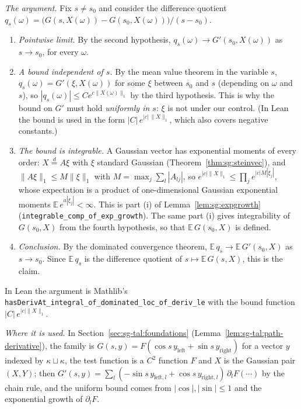 \begin{remark}
\emph{The argument.} Fix $s\ne s_0$ and consider the difference quotient $q_s(\omega)=\big(G(s,X(\omega))-G(s_0,X(\omega))\big)/(s-s_0)$.
\begin{enumerate}
\item \emph{Pointwise limit.} By the second hypothesis, $q_s(\omega)\to G'(s_0,X(\omega))$ as $s\to s_0$, for every $\omega$.
\item \emph{A bound independent of $s$.} By the mean value theorem in the variable $s$, $q_s(\omega)=G'(\xi,X(\omega))$ for some $\xi$ between $s_0$ and $s$ (depending on $\omega$ and $s$), so
  $|q_s(\omega)|\le Ce^{c\|X(\omega)\|_1}$ by the third hypothesis. This is why the bound on $G'$ must hold \emph{uniformly in $s$}: $\xi$ is not under our control. (In Lean the bound is used in the form
  $|C|\,e^{|c|\,\|X\|_1}$, which also covers negative constants.)
\item \emph{The bound is integrable.} A Gaussian vector has exponential moments of every order: $X\overset d=A\xi$ with $\xi$ standard Gaussian (Theorem~\ref{thm:sg:steinvec}), and $\|A\xi\|_1\le M\|\xi\|_1$ with $M=\max_j\sum_l|A_{lj}|$, so
  $e^{|c|\|X\|_1}\le\prod_je^{|c|M|\xi_j|}$, whose expectation is a product of one-dimensional Gaussian exponential moments $\mathbb E\,e^{a|\xi_j|}<\infty$. This is part (i) of Lemma~\ref{lem:sg:expgrowth} (\texttt{integrable\_comp\_of\_exp\_growth}).
  The same part (i) gives integrability of $G(s_0,X)$ from the fourth hypothesis, so that $\mathbb E\,G(s_0,X)$ is defined.
\item \emph{Conclusion.} By the dominated convergence theorem, $\mathbb E\,q_s\to\mathbb E\,G'(s_0,X)$ as $s\to s_0$. Since $\mathbb E\,q_s$ is the difference quotient of $s\mapsto\mathbb E\,G(s,X)$, this is the claim.
\end{enumerate}
In Lean the argument is Mathlib's \texttt{hasDerivAt\_integral\_of\_dominated\_loc\_of\_deriv\_le} with the bound function $|C|\,e^{|c|\|X\|_1}$.

\emph{Where it is used.} In Section~\ref{sec:sg-tal:foundations} (Lemma~\ref{lem:sg-tal:path-derivative}), the family is $G(s,y)=F(\cos s\,y_{\mathrm{left}}+\sin s\,y_{\mathrm{right}})$ for a vector $y$ indexed by $\kappa\sqcup\kappa$, the test function is a $C^2$ function $F$ and $X$ is the Gaussian pair $(X,Y)$; then
$G'(s,y)=\sum_l(-\sin s\,y_{\mathrm{left},l}+\cos s\,y_{\mathrm{right},l})\,\partial_lF(\cdots)$ by the chain rule, and the uniform bound comes from $|\cos|,|\sin|\le1$ and the exponential growth of $\partial_lF$.
\end{remark}

